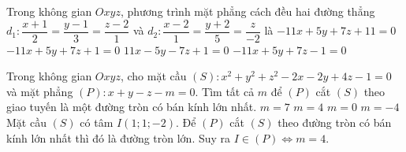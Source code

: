 \begin{ex}%
	Trong không gian $Oxyz$, phương trình mặt phẳng cách đều hai đường thẳng $d_1 \colon \dfrac{x+1}{2}=\dfrac{y-1}{3}=\dfrac{z-2}{1}$ và $d_2 \colon \dfrac{x-2}{1}=\dfrac{y+2}{5}=\dfrac{z}{-2}$ là
	\choice
	{$-11x+5y+7z+11=0$}
	{\True $-11x+5y+7z+1=0$}
	{$11x-5y-7z+1=0$}
	{$-11x+5y+7z-1=0$}
\end{ex}

\begin{ex}%
	Trong không gian $Oxyz$, cho mặt cầu $(S)\colon x^2+y^2+z^2-2x-2y+4z-1=0$ và mặt phẳng $(P)\colon x+y-z-m=0$. Tìm tất cả $m$ để $(P)$ cắt $(S)$ theo giao tuyến là một đường tròn có bán kính lớn nhất.
	\choice
	{$m=7$}
	{\True $m=4$}
	{$m=0$}
	{$m=-4$}
	\loigiai
	{
		Mặt cầu $(S)$ có tâm $I(1;1;-2)$. Để $(P)$ cắt $(S)$ theo đường tròn có bán kính lớn nhất thì đó là đường tròn lớn. Suy ra $I \in (P) \Leftrightarrow m=4$.
	}
\end{ex}

